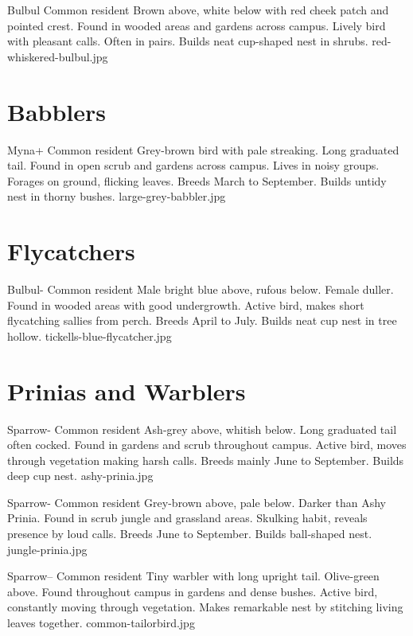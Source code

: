 \documentclass[aspectratio=169]{beamer}
\begin{document}
{Bulbul}
{Common resident}
{Brown above, white below with red cheek patch and pointed crest.}
{Found in wooded areas and gardens across campus.}
{Lively bird with pleasant calls. Often in pairs.}
{Builds neat cup-shaped nest in shrubs.}
{red-whiskered-bulbul.jpg}

\section{Babblers}
{Myna+}
{Common resident}
{Grey-brown bird with pale streaking. Long graduated tail.}
{Found in open scrub and gardens across campus.}
{Lives in noisy groups. Forages on ground, flicking leaves.}
{Breeds March to September. Builds untidy nest in thorny bushes.}
{large-grey-babbler.jpg}

\section{Flycatchers}
{Bulbul-}
{Common resident}
{Male bright blue above, rufous below. Female duller.}
{Found in wooded areas with good undergrowth.}
{Active bird, makes short flycatching sallies from perch.}
{Breeds April to July. Builds neat cup nest in tree hollow.}
{tickells-blue-flycatcher.jpg}

\section{Prinias and Warblers}
{Sparrow-}
{Common resident}
{Ash-grey above, whitish below. Long graduated tail often cocked.}
{Found in gardens and scrub throughout campus.}
{Active bird, moves through vegetation making harsh calls.}
{Breeds mainly June to September. Builds deep cup nest.}
{ashy-prinia.jpg}

{Sparrow-}
{Common resident}
{Grey-brown above, pale below. Darker than Ashy Prinia.}
{Found in scrub jungle and grassland areas.}
{Skulking habit, reveals presence by loud calls.}
{Breeds June to September. Builds ball-shaped nest.}
{jungle-prinia.jpg}

{Sparrow--}
{Common resident}
{Tiny warbler with long upright tail. Olive-green above.}
{Found throughout campus in gardens and dense bushes.}
{Active bird, constantly moving through vegetation.}
{Makes remarkable nest by stitching living leaves together.}
{common-tailorbird.jpg}
\end{document}
